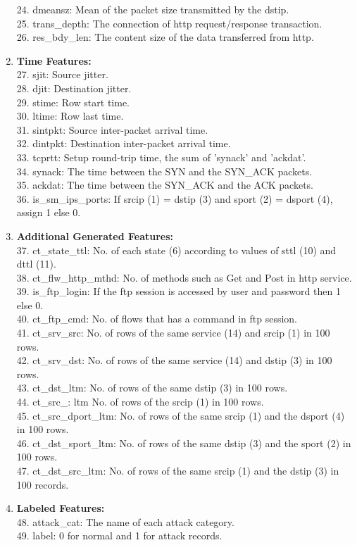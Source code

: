 \begin{enumerate}
    24. dmeansz: Mean of the packet size transmitted by the dstip. \\
    25. trans\_depth: The connection of http request/response transaction. \\
    26. res\_bdy\_len: The content size of the data transferred from http.
\item \textbf{Time Features:} \\
    27. sjit: Source jitter. \\
    28. djit: Destination jitter. \\
    29. stime: Row start time. \\
    30. ltime: Row last time. \\
    31. sintpkt: Source inter-packet arrival time. \\
    32. dintpkt: Destination inter-packet arrival time. \\
    33. tcprtt: Setup round-trip time, the sum of ’synack’ and ’ackdat’. \\
    34. synack: The time between the SYN and the SYN\_ACK packets. \\
    35. ackdat: The time between the SYN\_ACK and the ACK packets. \\
    36. is\_sm\_ips\_ports: If srcip (1) = dstip (3) and sport (2) = dsport (4), assign 1 else 0.
\item \textbf{Additional Generated Features:} \\
    37. ct\_state\_ttl: No. of each state (6) according to values of sttl (10) and dttl (11). \\
    38. ct\_flw\_http\_mthd: No. of methods such as Get and Post in http service. \\
    39. is\_ftp\_login: If the ftp session is accessed by user and password then 1 else 0. \\
    40. ct\_ftp\_cmd: No. of flows that has a command in ftp session. \\
    41. ct\_srv\_src: No. of rows of the same service (14) and srcip (1) in 100 rows. \\
    42. ct\_srv\_dst: No. of rows of the same service (14) and dstip (3) in 100 rows. \\
    43. ct\_dst\_ltm: No. of rows of the same dstip (3) in 100 rows. \\
    44. ct\_src\_: ltm No. of rows of the srcip (1) in 100 rows. \\
    45. ct\_src\_dport\_ltm: No. of rows of the same srcip (1) and the dsport (4) in 100 rows. \\
    46. ct\_dst\_sport\_ltm: No. of rows of the same dstip (3) and the sport (2) in 100 rows. \\
    47. ct\_dst\_src\_ltm: No. of rows of the same srcip (1) and the dstip (3) in 100 records.
\item \textbf{Labeled Features:} \\
    48. attack\_cat: The name of each attack category. \\
    49. label: 0 for normal and 1 for attack records.
\end{enumerate}

